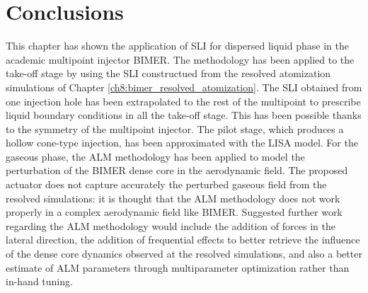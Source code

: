 %


\section{Conclusions}


This chapter has shown the application of SLI for dispersed liquid phase in the academic multipoint injector BIMER. The methodology has been applied to the take-off stage by using the SLI constructued from the resolved atomization simulations of Chapter \ref{ch8:bimer_resolved_atomization}. The SLI obtained from one injection hole has been extrapolated to the rest of the multipoint to prescribe liquid boundary conditions in all the take-off stage. This has been possible thanks to the symmetry of the multipoint injector. The pilot stage, which produces a hollow cone-type injection, has been approximated with the LISA 
model. For the gaseous phase, the ALM methodology has been applied to model the perturbation of the BIMER dense core in the aerodynamic field. The proposed actuator does not capture accurately the perturbed gaseous field from the resolved simulations: it is thought that the ALM methodology does not work properly in a complex aerodynamic field like BIMER. Suggested further work regarding the ALM methodology would include the addition of forces in the lateral direction, the addition of frequential effects to better retrieve the influence of the dense core dynamics observed at the resolved simulations, and also a better estimate of ALM parameters through multiparameter optimization rather than in-hand tuning.

